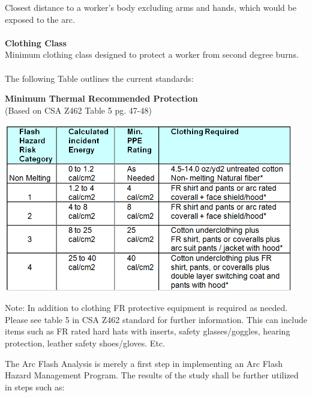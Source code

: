 Closest distance to a worker's body excluding arms and hands, which would be exposed to the arc.
\\
\\		
\textbf{Clothing Class}\\
Minimum clothing class designed to protect a worker from second degree burns.
\\
\\
The following Table outlines the current standards:
\\
\begin{center}

\textbf{Minimum Thermal Recommended Protection}\\
(Based on CSA Z462 Table 5 pg. 47-48)

\includegraphics[width=5in, keepaspectratio=true]{Images/Clothing.png} \\

\end{center}

\noindent *Note: In addition to clothing FR protective equipment is required as needed. Please see table 5 in CSA Z462 standard for further information. This can include items such as FR rated hard hats with inserts, safety glasses/goggles, hearing protection, leather safety shoes/gloves. Etc.

\pagebreak

\noindent The Arc Flash Analysis is merely a first step in implementing an Arc Flash Hazard Management Program.  The results of the study shall be further utilized in steps such as:\\

